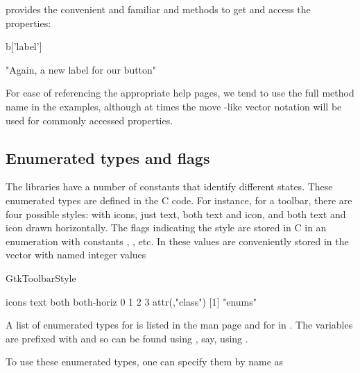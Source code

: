  provides the convenient and familiar \code{[} and
\code{[$<$-} methods to get and access the properties:
\begin{Schunk}
\begin{Sinput}
 b['label']
\end{Sinput}
\begin{Soutput}
[1] "Again, a new label for our button"
\end{Soutput}
\end{Schunk}

For ease of referencing the appropriate help pages, we tend to use the
full method name in the examples, although at times the move \R-like
vector notation will be used for commonly accessed properties.


\subsection{Enumerated types and flags}


The \GTK\/ libraries have a number of constants that identify
different states. These enumerated types are defined in the C
code. For instance, for a toolbar, there are four possible styles: with
icons, just text, both text and icon, and both text and icon drawn
horizontally. The flags indicating the style are stored in C in an
enumeration  with constants
, , etc. In 
these values are conveniently stored in the vector
 with named integer values
\begin{Schunk}
\begin{Sinput}
 GtkToolbarStyle
\end{Sinput}
\begin{Soutput}
     icons       text       both both-horiz 
         0          1          2          3 
attr(,"class")
[1] "enums"
\end{Soutput}
\end{Schunk}

A  list of enumerated types for \GTK\/ is listed in the man
page  and for  in
. The   variables are
prefixed with  and so can be found using ,
say, using .

To use these enumerated types, one can specify them by name as
\begin{Schunk}
\end{Schunk}

